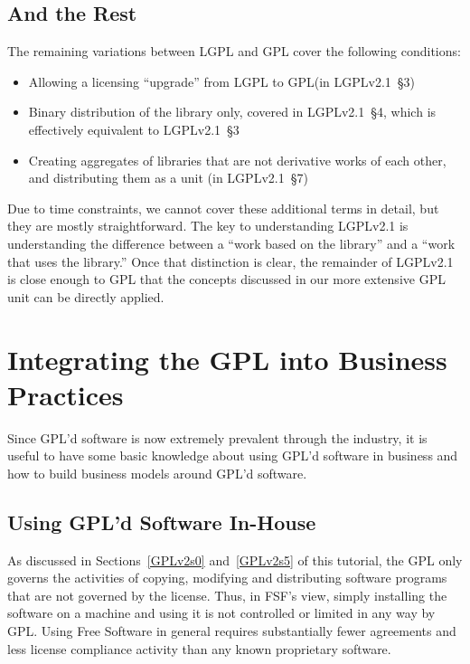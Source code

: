 \section{And the Rest}

The remaining variations between LGPL and GPL cover the following
conditions:

\begin{itemize}

\item Allowing a licensing ``upgrade'' from LGPL to GPL\@ (in LGPLv2.1~\S3)

\item Binary distribution of the library only, covered in LGPLv2.1~\S4,
  which is effectively equivalent to LGPLv2.1~\S3

\item Creating aggregates of libraries that are not derivative works of
  each other, and distributing them as a unit (in LGPLv2.1~\S7)

\end{itemize}


Due to time constraints, we cannot cover these additional terms in detail,
but they are mostly straightforward. The key to understanding LGPLv2.1 is
understanding the difference between a ``work based on the library'' and a
``work that uses the library.''  Once that distinction is clear, the
remainder of LGPLv2.1 is close enough to GPL that the concepts discussed in
our more extensive GPL unit can be directly applied.

\chapter{Integrating the GPL into Business Practices}

Since GPL'd software is now extremely prevalent through the industry, it
is useful to have some basic knowledge about using GPL'd software in
business and how to build business models around GPL'd software.

\section{Using GPL'd Software In-House}

As discussed in Sections~\ref{GPLv2s0} and~\ref{GPLv2s5} of this tutorial,
the GPL only governs the activities of copying, modifying and
distributing software programs that are not governed by the license.
Thus, in FSF's view, simply installing the software on a machine and
using it is not controlled or limited in any way by GPL\@. Using Free
Software in general requires substantially fewer agreements and less
license compliance activity than any known proprietary software.

